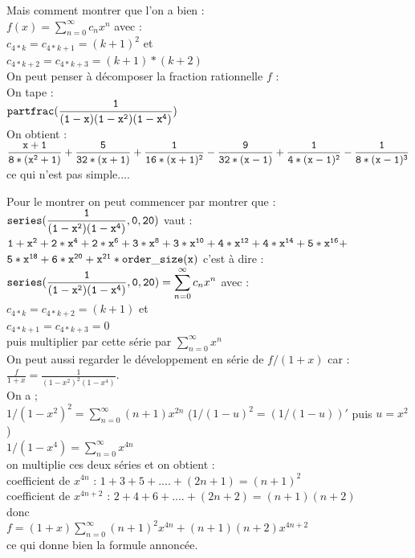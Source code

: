 \documentclass[a4paper,11pt]{book}
\begin{document}
Mais comment montrer que l'on a bien :\\
$f(x)=\sum_{n=0}^\infty c_nx^n$ avec :\\
$c_{4*k}=c_{4*k+1}=(k+1)^2$ et \\
$c_{4*k+2}=c_{4*k+3}=(k+1)*(k+2)$\\
On peut penser \`a d\'ecomposer la fraction rationnelle $f$ :\\
On tape :\\
$\displaystyle {\tt partfrac(\frac{1}{(1-x)(1-x^2)(1-x^4)})}$\\
On obtient :\\
$\displaystyle {\tt \frac{x+1}{8*(x^2+1)}+\frac{5}{32*(x+1)}+\frac{1}{16*(x+1)^2}-\frac{9}{32*(x-1)}+\frac{1}{4*(x-1)^2}-\frac{1}{8*(x-1)^3}}$\\
ce qui n'est pas simple....
 
Pour le montrer on peut commencer par montrer que :\\
$\displaystyle {\tt series(\frac{1}{(1-x^2)(1-x^4)},0,20)}$ vaut :\\
${\tt 1+x^2+2*x^4+2*x^6+3*x^8+3*x^{10}+4*x^{12}+4*x^{14}+5*x^{16}+}$\\
${\tt 5*x^{18}+6*x^{20}+x^{21}*order\_size(x)}$ c'est \`a dire :\\
$\displaystyle {\tt series(\frac{1}{(1-x^2)(1-x^4)},0,20)}=\sum_{n=0}^\infty c_nx^n$ avec :\\
$c_{4*k}=c_{4*k+2}=(k+1)$ et \\
$c_{4*k+1}=c_{4*k+3}=0$\\
puis multiplier par cette s\'erie par $\sum_{n=0}^\infty x^n$ \\
On peut aussi regarder le d\'eveloppement en s\'erie de $f/(1+x)$ car :\\
 $\frac{f}{1+x}=\frac{1}{(1-x^2)^2(1-x^4)}$.\\
On a ;\\
$1/(1-x^2)^2=\sum_{n=0}^\infty (n+1)x^{2n}$ ($1/(1-u)^2=(1/(1-u))'$ puis $u=x^2$)\\
$1/(1-x^4)=\sum_{n=0}^\infty x^{4n}$\\
on multiplie ces deux s\'eries et on obtient :\\
coefficient de $x^{4n}$ : $1+3+5+....+(2n+1)=(n+1)^2$\\
coefficient de $x^{4n+2}$ : $2+4+6+....+(2n+2)=(n+1)(n+2)$\\
donc\\
$f=(1+x)\sum_{n=0}^\infty (n+1)^2x^{4n}+(n+1)(n+2)x^{4n+2}$\\
ce qui donne bien la formule annonc\'ee.\\
\end{document}
